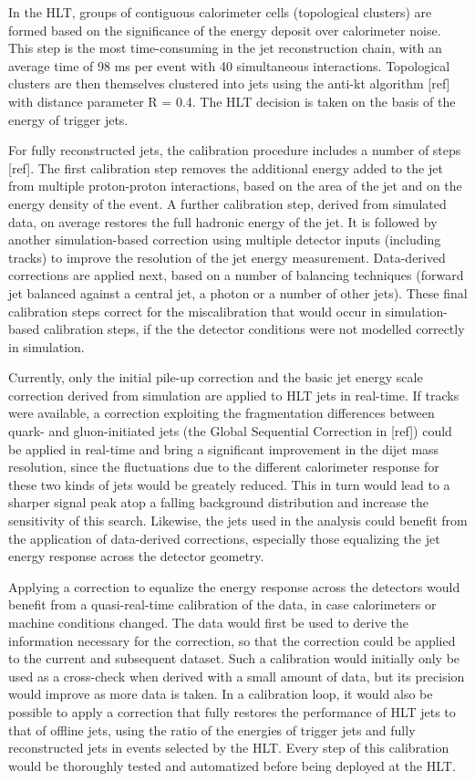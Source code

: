 \documentclass[a4paper,justified]{tufte-handout}
\begin{document}
In the HLT, groups of contiguous calorimeter cells (topological clusters) are formed based on the significance of the energy deposit over calorimeter noise. This step is the most time-consuming in the jet reconstruction chain, with an average time of 98 ms per event with 40 simultaneous interactions. Topological clusters are then themselves clustered into jets using the anti-kt algorithm [ref] with distance parameter R = 0.4. The HLT decision is taken on the basis of the energy of trigger jets. 

For fully reconstructed jets, the calibration procedure includes a number of steps [ref]. The first calibration step removes the additional energy added to the jet from multiple proton-proton interactions, based on the area of the jet and on the energy density of the event. A further calibration step, derived from simulated data, on average restores the full hadronic energy of the jet. It is followed by another simulation-based correction using multiple detector inputs (including tracks) to improve the resolution of the jet energy measurement. Data-derived corrections are applied next, based on a number of balancing techniques (forward jet balanced against a central jet, a photon or a number of other jets). These final calibration steps correct for the miscalibration that would occur in simulation-based calibration steps, if the the detector conditions were not modelled correctly in simulation. 

Currently, only  the initial pile-up correction and the basic jet energy scale correction derived from simulation are applied to HLT jets in real-time. If tracks were available, a correction exploiting the fragmentation differences between quark- and gluon-initiated jets (the Global Sequential Correction in [ref]) could  be applied in real-time and bring a significant improvement in the dijet mass resolution, since the fluctuations due to the different calorimeter response for these two kinds of jets would be greately reduced. This in turn would lead to a sharper signal peak atop a falling background distribution and increase the sensitivity of this search. Likewise, the jets used in the analysis could benefit from the application of data-derived corrections, especially those equalizing the jet energy response across the detector geometry. 

Applying a correction to equalize the energy response across the detectors would benefit from a quasi-real-time calibration of the data, in case calorimeters or machine conditions changed. The data would first be used to derive the information necessary for the correction, so that the correction could be applied to the current and subsequent dataset. Such a calibration would initially only be used as a cross-check when derived with a small amount of data, but its precision would improve as more data is taken. In a calibration loop, it  would also be possible to apply a correction that fully restores the performance of HLT jets to that of offline jets, using the ratio of the energies of trigger jets and fully reconstructed jets in events selected by the HLT. Every step of this calibration would be thoroughly tested and automatized before being deployed at the HLT. 
\end{document}

